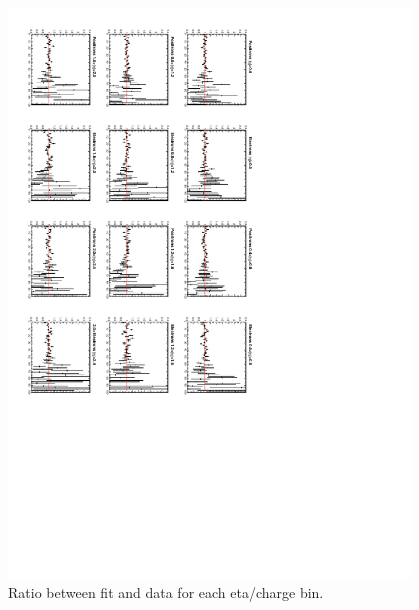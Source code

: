 \begin{figure}
\begin{center}
\includegraphics[trim = 40mm 100mm 40mm 0mm, clip, angle=90, width=0.95\textwidth]{Dec22_fitratio}
     \caption{\label{fig:fit1ratio}Ratio between fit and data for each eta/charge bin.}
  \end{center}
\end{figure}

